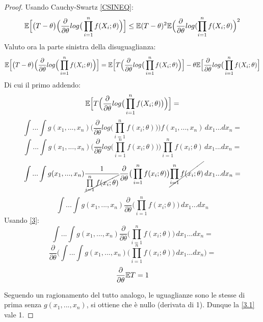 \begin{theorem}
\begin{proof}
Usando Cauchy-Swartz \ref{CSINEQ}:
\begin{equation} \label{3.0}
   \mathbb{E} \Big[\big(T-\theta\big)\Big(\frac{\partial}{\partial\theta}log\big(\prod_{i=1}^nf(X_i;\theta)\Big)\Big] \leq \mathbb{E}(T-\theta)^2\mathbb{E}\Big(\frac{\partial}{\partial\theta}log(\prod_{i=1}^nf(X_i;\theta)\Big)^2 
\end{equation}
Valuto ora la parte sinistra della disuguaglianza:
\begin{equation} \label{3.1}
   \mathbb{E} \Big[\big(T-\theta\big)\Big(\frac{\partial}{\partial\theta}log\Big(\prod_{i=1}^nf(X_i;\theta)\Big)\Big]=\mathbb{E} \Big[T\Big(\frac{\partial}{\partial\theta}log\big(\prod_{i=1}^nf(X_i;\theta)\Big)\Big]-\theta\mathbb{E} \Big[\frac{\partial}{\partial\theta}log\big(\prod_{i=1}^nf(X_i;\theta)\Big] 
\end{equation}
Di cui il primo addendo:
\[\mathbb{E} \Big[T\Big(\frac{\partial}{\partial\theta}log\big(\prod_{i=1}^nf(X_i;\theta)\big)\Big)\Big]=\]
\[\int...\int g(x_1,...,x_n)\Big(\frac{\partial}{\partial\theta}log\big(\prod\limits_{i=1}^n f(x_i;\theta)\big)\Big) f(x_1,...,x_n) \,dx_1...dx_n=\]
\[\int...\int g(x_1,...,x_n)\Big(\frac{\partial}{\partial\theta}log\big(\prod\limits_{i=1}^n f(x_i;\theta)\big)\Big) \prod\limits_{i=1}^n f(x_i;\theta) \,dx_1...dx_n=\]
\[\int...\int g(x_1,...,x_n)\frac{1}{\cancel{\prod\limits_{i=1}^n f(x_i;\theta)}}\frac{\partial}{\partial\theta}\big(\prod\limits_{i=1}^n f(x_i;\theta)\big)\cancel{\prod\limits_{i=1}^n f(x_i;\theta)}\,dx_1...dx_n=\]
\[\int...\int g(x_1,...,x_n)\frac{\partial}{\partial\theta}\big(\prod\limits_{i=1}^n f(x_i;\theta)\big)\,dx_1...dx_n\]
Usando \ref{3}:
\[\int...\int g(x_1,...,x_n)\frac{\partial}{\partial\theta}\big(\prod\limits_{i=1}^n f(x_i;\theta)\big)\,dx_1...dx_n=\]
\[\frac{\partial}{\partial\theta}\bigg(\int...\int g(x_1,...,x_n)\big(\prod\limits_{i=1}^n f(x_i;\theta)\big)\,dx_1...dx_n\bigg)=\]
\[\frac{\partial}{\partial\theta} \mathbb{E} T=1\]


Seguendo un ragionamento del tutto analogo, le uguaglianze sono le stesse di prima senza $g(x_1,...,x_n)$, si ottiene che è nullo (derivata di 1). Dunque la \ref{3.1} vale 1.


\end{proof}
\end{theorem}
